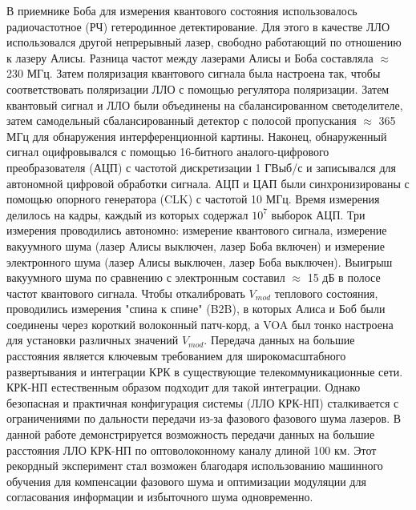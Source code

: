 В приемнике Боба для измерения квантового состояния использовалось радиочастотное (РЧ) гетеродинное детектирование. Для этого в качестве ЛЛО использовался другой непрерывный лазер, свободно работающий по отношению к лазеру Алисы. Разница частот между
лазерами Алисы и Боба составляла $\approx$ 230 МГц. Затем поляризация квантового сигнала была настроена так, чтобы соответствовать поляризации ЛЛО с помощью регулятора поляризации. Затем квантовый сигнал и ЛЛО были объединены на сбалансированном светоделителе,
затем самодельный сбалансированный детектор с полосой пропускания
$\approx$ 365 МГц для обнаружения интерференционной картины. Наконец, обнаруженный сигнал оцифровывался с помощью 16-битного аналого-цифрового преобразователя (АЦП) с частотой дискретизации 1 ГВыб/с и записывался для автономной цифровой обработки сигнала. АЦП и ЦАП были синхронизированы с помощью опорного генератора (CLK) с частотой 10 МГц.
Время измерения делилось на кадры, каждый из которых содержал $10^7$ выборок АЦП. Три измерения проводились автономно: измерение квантового сигнала, измерение вакуумного шума (лазер Алисы выключен, лазер Боба включен) и измерение электронного шума (лазер Алисы выключен, лазер Боба выключен). Выигрыш вакуумного шума по сравнению с электронным составил $\approx$ 15 дБ в полосе частот квантового сигнала. Чтобы откалибровать $V_{mod}$ теплового состояния, проводились измерения "спина к спине" (B2B), в которых Алиса и Боб были соединены через короткий волоконный патч-корд, а VOA был тонко настроена для установки различных значений $V_{mod}$.
\newline Передача данных на большие расстояния является ключевым требованием для широкомасштабного развертывания и интеграции КРК в существующие телекоммуникационные сети. КРК-НП естественным образом подходит для такой интеграции. Однако безопасная и практичная конфигурация системы (ЛЛО КРК-НП) сталкивается с ограничениями по дальности передачи из-за фазового
фазового шума лазеров. В данной работе демонстрируется  возможность передачи данных на большие расстояния ЛЛО КРК-НП по оптоволоконному каналу длиной 100 км. Этот рекордный эксперимент стал возможен благодаря использованию машинного обучения для компенсации фазового шума и оптимизации модуляции для согласования информации и избыточного шума одновременно.

